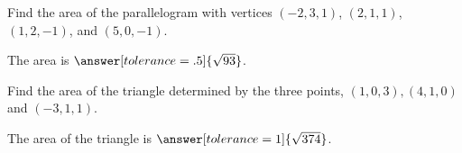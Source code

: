 \documentclass{ximera}
\begin{document}
  
  \begin{problem}
    Find the area of the parallelogram with vertices $(-2,3,1)$,
    $(2,1,1)$, $(1,2,-1)$, and $(5,0,-1)$.

    The area is $\answer[tolerance=.5]{\sqrt{93}}$.
  \end{problem}
  
  \begin{problem}
    Find the area of the triangle determined by the three points,
    $(1,0,3),(4,1,0)$ and $(-3,1,1)$.
    
    
    The area of the triangle is
     $\answer[tolerance=1]{\sqrt{374}}$. 
  \end{problem}
  
\end{document}
